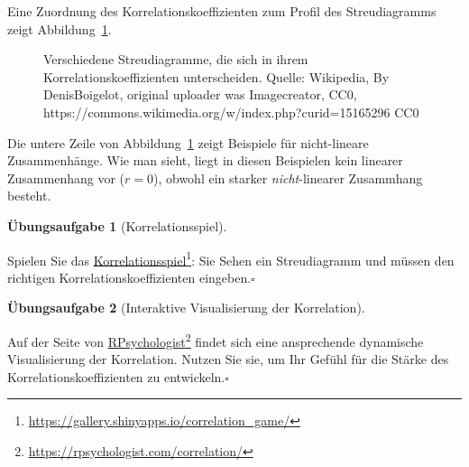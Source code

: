\documentclass[
  a4paper,
]{scrbook}
\theoremstyle{definition}
\theoremstyle{definition}
\theoremstyle{definition}
\newtheorem{exercise}{Übungsaufgabe}[chapter]
\theoremstyle{remark}
\begin{document}
Eine Zuordnung des Korrelationskoeffizienten zum Profil des
Streudiagramms zeigt Abbildung~\ref{fig-corr-wiki}.

\begin{figure}


\caption{\label{fig-corr-wiki}Verschiedene Streudiagramme, die sich in
ihrem Korrelationskoeffizienten unterscheiden. Quelle: Wikipedia, By
DenisBoigelot, original uploader was Imagecreator, CC0,
https://commons.wikimedia.org/w/index.php?curid=15165296 CC0}

\end{figure}%

Die untere Zeile von Abbildung~\ref{fig-corr-wiki} zeigt Beispiele für
nicht-lineare Zusammenhänge. Wie man sieht, liegt in diesen Beispielen
kein linearer Zusammenhang vor (\(r=0\)), obwohl ein starker
\emph{nicht}-linearer Zusammhang besteht.

\begin{exercise}[Korrelationsspiel]\protect\hypertarget{exr-corrgame}{}\label{exr-corrgame}

Spielen Sie das
\href{https://gallery.shinyapps.io/correlation_game/}{Korrelationsspiel}\footnote{\url{https://gallery.shinyapps.io/correlation_game/}}:
Sie Sehen ein Streudiagramm und müssen den richtigen
Korrelationskoeffizienten eingeben.\(\square\)

\end{exercise}

\begin{exercise}[Interaktive Visualisierung der
Korrelation]\protect\hypertarget{exr-corrvis}{}\label{exr-corrvis}

Auf der Seite von
\href{https://rpsychologist.com/correlation/}{RPsychologist}\footnote{\url{https://rpsychologist.com/correlation/}}
findet sich eine ansprechende dynamische Visualisierung der Korrelation.
Nutzen Sie sie, um Ihr Gefühl für die Stärke des
Korrelationskoeffizienten zu entwickeln.\(\square\)

\end{exercise}
\end{document}
